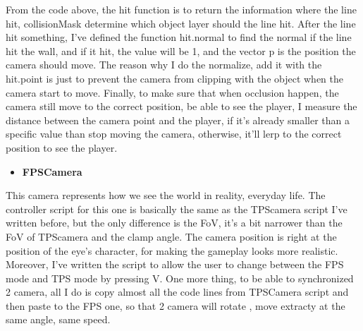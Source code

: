 \documentclass[a4paper, 13pt]{extarticle}
\begin{document}
From the code above, the hit function is to return the information where the line hit, collisionMask determine which object layer should the line hit. After the line hit something, I've defined the function hit.normal to find the normal if the line hit the wall, and if it hit, the value will be 1, and the vector p is the position the camera should move. The reason why I do the normalize, add it with the hit.point is just to prevent the camera from clipping with the object when the camera start to move. Finally, to make sure that when occlusion happen, the camera still move to the correct position, be able to see the player, I measure the distance between the camera point and the player, if it's already smaller than a specific value than stop moving the camera, otherwise, it'll lerp to the correct position to see the player.  
\begin{itemize}
	\item \bfseries FPSCamera 	 	
\end{itemize}
	This camera represents how we see the world in reality, everyday life. The controller script for this one is basically the same as the TPScamera script I've written before, but the only difference is the FoV, it's a bit narrower than the FoV of TPScamera and the clamp angle. The camera position is right at the position of the eye's character, for making the gameplay looks more realistic. Moreover, I've written the script to allow the user to change between the FPS mode and TPS mode by pressing V. One more thing, to be able to synchronized 2 camera, all I do is copy almost all the code lines from TPSCamera script and then paste to the FPS one, so that 2 camera will rotate , move extracty at the same angle, same speed. 
\end{document}
